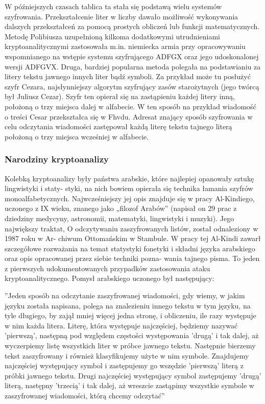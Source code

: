 \documentclass[a4paper]{article}
\begin{document}
W późniejszych czasach tablica ta stała się podstawą wielu systemów szyfrowania. Przekształcenie
liter w liczby dawało możliwość wykonywania dalszych przekształceń za pomocą prostych obliczeń
lub funkcji matematycznych. Metodę Polibiusza uzupełnioną kilkoma dodatkowymi utrudnieniami
kryptoanalitycznymi zastosowała m.in. niemiecka armia przy opracowywaniu wspomnianego na
wstępie systemu szyfrującego ADFGX oraz jego udoskonalonej wersji ADFGVX.
Druga, bardziej popularna metoda polegała na podstawianiu za litery tekstu jawnego innych liter
bądź symboli. Za przykład może tu posłużyć szyfr Cezara, najsłynniejszy algorytm szyfrujący zasów starożytnych (jego twórcą był Juliusz Cezar). Szyfr ten opierał się na zastąpieniu każdej
litery inną, położoną o trzy miejsca dalej w alfabecie. W ten sposób na przykład wiadomość o treści
Cesar przekształca się w Fhvdu. Adresat znający sposób szyfrowania w celu odczytania wiadomości
zastępował każdą literę tekstu tajnego literą położoną o trzy miejsca wcześniej w alfabecie.

\subsubsection{Narodziny kryptoanalizy}
Kolebką kryptoanalizy były państwa arabskie, które najlepiej opanowały sztukę lingwistyki i staty-
styki, na nich bowiem opierała się technika łamania szyfrów monoalfabetycznych. Najwcześniejszy
jej opis znajduje się w pracy Al-Kindiego, uczonego z IX wieku, znanego jako „filozof Arabów”
(napisał on 29 prac z dziedziny medycyny, astronomii, matematyki, lingwistyki i muzyki). Jego
największy traktat, O odczytywaniu zaszyfrowanych listów, został odnaleziony w 1987 roku w Ar-
chiwum Ottomańskim w Stambule. W pracy tej Al-Kindi zawarł szczegółowe rozważania na temat
statystyki fonetyki i składni języka arabskiego oraz opis opracowanej przez siebie techniki pozna-
wania tajnego pisma. To jeden z pierwszych udokumentowanych przypadków zastosowania ataku
kryptoanalitycznego. Pomysł arabskiego uczonego był następujący:

\begin{center}
”Jeden sposób na odczytanie zaszyfrowanej wiadomości, gdy wiemy, w jakim języku została
napisana, polega na znalezieniu innego tekstu w tym języku, na tyle długiego, by zajął mniej
więcej jedna stronę, i obliczeniu, ile razy występuje w nim każda litera. Literę, która występuje
najczęściej, będziemy nazywać ’pierwszą’, następną pod względem częstości występowania ’drugą’
i tak dalej, aż wyczerpiemy listę wszystkich liter w próbce jawnego tekstu. Następnie bierzemy
tekst zaszyfrowany i również klasyfikujemy użyte w nim symbole. Znajdujemy najczęściej
występujący symbol i zastępujemy go wszędzie ’pierwszą’ literą z próbki jawnego tekstu. Drugi
najczęściej występujący symbol zastępujemy ’drugą’ literą, następny ’trzecią’ i tak dalej, aż
wreszcie zastąpimy wszystkie symbole w zaszyfrowanej wiadomości, którą chcemy odczytać” \cite{2}
\end{center}
\end{document}
